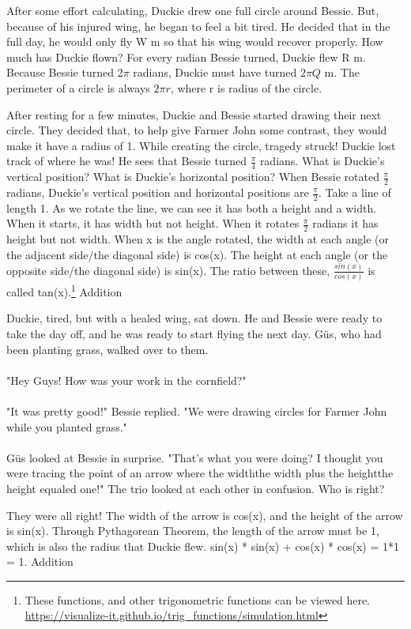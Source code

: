 {After some effort calculating, Duckie drew one full circle around Bessie. But, because of his injured wing, he began to feel a bit tired. He decided that in the full day, he would only fly W m so that his wing would recover properly. How much has Duckie flown?}
 {For every radian Bessie turned, Duckie flew R m. Because Bessie turned 2$\pi$ radians, Duckie must have turned $2\pi Q$ m.}
 {The perimeter of a circle is always $2\pi r$, where r is radius of the circle.}
 {}
 {After resting for a few minutes, Duckie and Bessie started drawing their next circle. They decided that, to help give Farmer John some contrast, they would make it have a radius of 1. While creating the circle, tragedy struck! Duckie lost track of where he was! He sees that Bessie turned $\frac{\pi}{4}$ radians. What is Duckie's vertical position? What is Duckie's horizontal position?}
 {When Bessie rotated $\frac{\pi}{2}$ radians, Duckie's vertical position and horizontal positions are $\frac{\pi}{2}$.}
 {Take a line of length 1. As we rotate the line, we can see it has both a height and a width. When it starts, it has width but not height. When it rotates $\frac{\pi}{2}$ radians it has height but not width. When x is the angle rotated, the width at each angle (or the adjacent side/the diagonal side) is cos(x). The height at each angle (or the opposite side/the diagonal side) is sin(x). The ratio between these, $\frac{sin(x)}{cos(x)}$ is called tan(x).\footnote{These functions, and other trigonometric functions can be viewed here. \url{https://visualize-it.github.io/trig_functions/simulation.html}}}
 {Addition}
 {Duckie, tired, but with a healed wing, sat down. He and Bessie were ready to take the day off, and he was ready to start flying the next day. Güs, who had been planting grass, walked over to them. 
 \paragraph{} "Hey Guys! How was your work in the cornfield?"
 \paragraph{} "It was pretty good!" Bessie replied. "We were drawing circles for Farmer John while you planted grass."
 \paragraph{} Güs looked at Bessie in surprise. "That's what you were doing? I thought you were tracing the point of an arrow where the width\texttimes the width plus the height\texttimes the height equaled one!"
 The trio looked at each other in confusion. Who is right?}
 {They were all right! The width of the arrow is cos(x), and the height of the arrow is sin(x). Through Pythagorean Theorem, the length of the arrow must be 1, which is also the radius that Duckie flew.}
 {sin(x) * sin(x) + cos(x) * cos(x) = 1*1 = 1.}
 {Addition}
